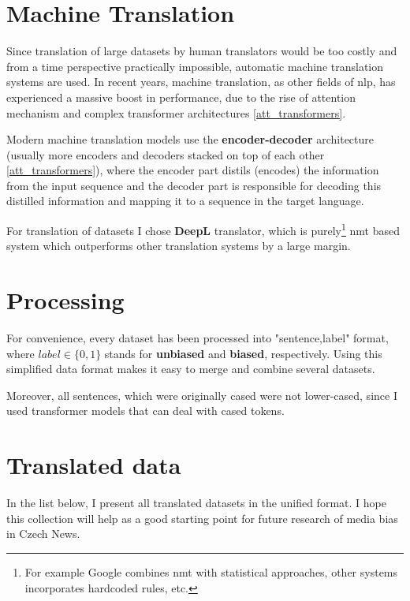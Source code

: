  
 
 
 
\section{Machine Translation}
Since translation of large datasets by human translators would be too costly and from a time perspective practically impossible, automatic machine translation systems are used. In recent years, machine translation, as other fields of \Gls{nlp}, has experienced a massive boost in performance, due to the rise of attention mechanism and complex transformer architectures \ref{att_transformers}.

Modern machine translation models use the \textbf{encoder-decoder} architecture (usually more encoders and decoders stacked on top of each other \ref{att_transformers}), where the encoder part distils (encodes) the information from the input sequence and the decoder part is responsible for decoding this distilled information and mapping it to a sequence in the target language.

For translation of datasets I chose \textbf{DeepL} translator, which is purely\footnote{For example Google combines \Gls{nmt} with statistical approaches, other systems incorporates hardcoded rules, etc.} \Gls{nmt} based system which outperforms other translation systems by a large margin.






\section{Processing}\label{processing}
For convenience, every dataset has been processed into "sentence,label" format, where $label \in \{0,1\}$ stands for \textbf{unbiased} and \textbf{biased}, respectively. Using this simplified data format makes it easy to merge and combine several datasets.
    
Moreover, all sentences, which were originally cased were not lower-cased, since I used transformer models that can deal with cased tokens.

\newpage
\section{Translated data}
In the list below, I present all translated datasets in the unified format. I hope this collection will help as a good starting point for future research of media bias in Czech News.

